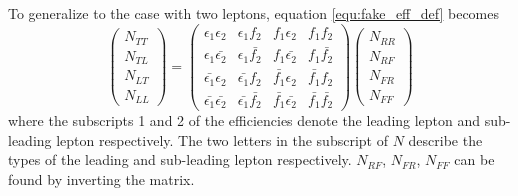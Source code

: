 To generalize to the case with two leptons, equation \ref{equ:fake_eff_def} becomes
\begin{equation}
\left( \begin{array}{c}
N_{TT} \\
N_{TL} \\
N_{LT} \\
N_{LL}
\end{array} \right)
=
\left( \begin{array}{cccc}
\epsilon_1 \epsilon_2 & \epsilon_1 f_2 & f_1 \epsilon_2 & f_1 f_2 \\
\epsilon_1 \bar{\epsilon_2} & \epsilon_1 \bar{f_2} & f_1 \bar{\epsilon_2} & f_1 \bar{f_2} \\
\bar{\epsilon_1} \epsilon_2 & \bar{\epsilon_1} f_2 & \bar{f_1} \epsilon_2 & \bar{f_1} f_2 \\
\bar{\epsilon_1} \bar{\epsilon_2} & \bar{\epsilon_1} \bar{f_2} & \bar{f_1} \bar{\epsilon_2} & \bar{f_1} \bar{f_2}
\end{array} \right)
\left( \begin{array}{c}
N_{RR} \\
N_{RF} \\
N_{FR} \\
N_{FF}
\end{array} \right)
\end{equation}
where the subscripts 1 and 2 of the efficiencies denote the leading lepton and sub-leading lepton respectively.
The two letters in the subscript of $N$ describe the types of the leading and sub-leading lepton respectively.
$N_{RF}$, $N_{FR}$, $N_{FF}$ can be found by inverting the matrix.
